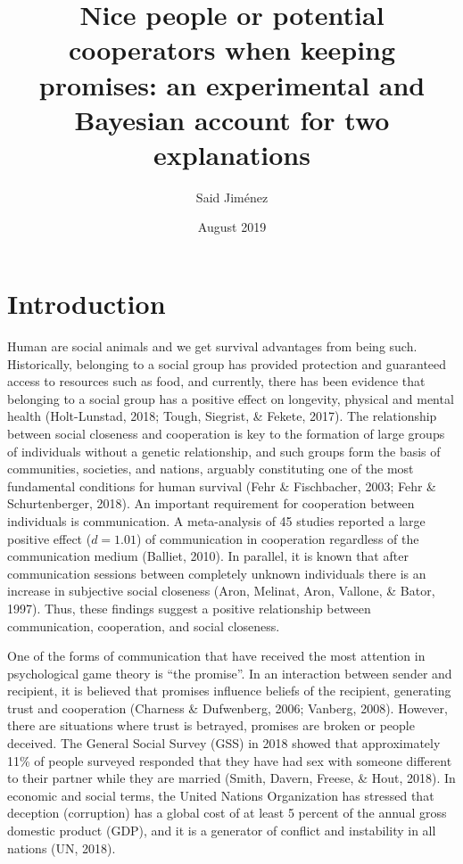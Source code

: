 \documentclass[12pt,]{article}
\title{Nice people or potential cooperators when keeping promises: an
experimental and Bayesian account for two explanations}
\author{Said Jiménez}
\date{August 2019}
\begin{document}
\maketitle

\hypertarget{introduction}{%
\section{Introduction}\label{introduction}}

Human are social animals and we get survival advantages from being such.
Historically, belonging to a social group has provided protection and
guaranteed access to resources such as food, and currently, there has
been evidence that belonging to a social group has a positive effect on
longevity, physical and mental health (Holt-Lunstad, 2018; Tough,
Siegrist, \& Fekete, 2017). The relationship between social closeness
and cooperation is key to the formation of large groups of individuals
without a genetic relationship, and such groups form the basis of
communities, societies, and nations, arguably constituting one of the
most fundamental conditions for human survival (Fehr \& Fischbacher,
2003; Fehr \& Schurtenberger, 2018). An important requirement for
cooperation between individuals is communication. A meta-analysis of 45
studies reported a large positive effect (\(d = 1.01\)) of communication
in cooperation regardless of the communication medium (Balliet, 2010).
In parallel, it is known that after communication sessions between
completely unknown individuals there is an increase in subjective social
closeness (Aron, Melinat, Aron, Vallone, \& Bator, 1997). Thus, these
findings suggest a positive relationship between communication,
cooperation, and social closeness.

One of the forms of communication that have received the most attention
in psychological game theory is ``the promise''. In an interaction
between sender and recipient, it is believed that promises influence
beliefs of the recipient, generating trust and cooperation (Charness \&
Dufwenberg, 2006; Vanberg, 2008). However, there are situations where
trust is betrayed, promises are broken or people deceived. The General
Social Survey (GSS) in 2018 showed that approximately 11\% of people
surveyed responded that they have had sex with someone different to
their partner while they are married (Smith, Davern, Freese, \& Hout,
2018). In economic and social terms, the United Nations Organization has
stressed that deception (corruption) has a global cost of at least 5
percent of the annual gross domestic product (GDP), and it is a
generator of conflict and instability in all nations (UN, 2018).
\end{document}
